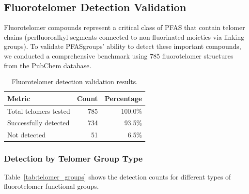 
\subsection*{Fluorotelomer Detection Validation}

Fluorotelomer compounds represent a critical class of PFAS that contain telomer chains (perfluoroalkyl segments connected to non-fluorinated moieties via linking groups). To validate PFASgroups' ability to detect these important compounds, we conducted a comprehensive benchmark using 785 fluorotelomer structures from the PubChem database.

\begin{table}[htbp]
\centering
\caption{Fluorotelomer detection validation results.}
\label{tab:telomer_validation}
\begin{tabular}{lrr}
\toprule
\textbf{Metric} & \textbf{Count} & \textbf{Percentage} \\
\midrule
Total telomers tested & 785 & 100.0\% \\
Successfully detected & 734 & 93.5\% \\
Not detected & 51 & 6.5\% \\
\bottomrule
\end{tabular}
\end{table}

\subsubsection*{Detection by Telomer Group Type}

Table~\ref{tab:telomer_groups} shows the detection counts for different types of fluorotelomer functional groups.

